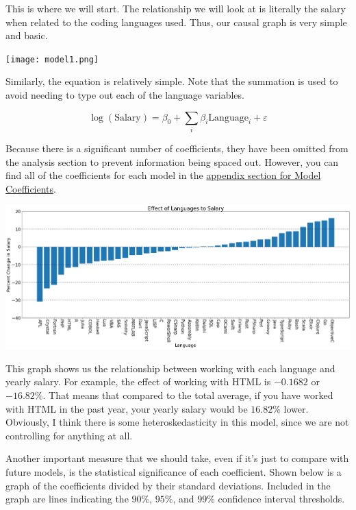 \documentclass{report}
\begin{document}
This is where we will start. The relationship we will look at is literally the salary when related to the coding languages used. Thus, our causal graph is very simple and basic.

\texttt{[image: model1.png]}

Similarly, the equation is relatively simple. Note that the summation is used to avoid needing to type out each of the language variables.

$$\log({\text{Salary}}) = \beta_0 + \sum_i{\beta_i \text{Language}_i} + \varepsilon$$

Because there is a significant number of coefficients, they have been omitted from the analysis section to prevent information being spaced out. However, you can find all of the coefficients for each model in the \hyperref[data:model1]{appendix section for Model Coefficients}.

\vspace{0.5in}

\includegraphics[width=0.9\linewidth]{model1coefficientlangauges.png}

\vspace{0.5in}

This graph shows us the relationship between working with each language and yearly salary. For example, the effect of working with HTML is $-0.1682$ or $-16.82\%$. That means that compared to the total average, if you have worked with HTML in the past year, your yearly salary would be $16.82\%$ lower. Obviously, I think there is some heteroskedasticity in this model, since we are not controlling for anything at all.

Another important measure that we should take, even if it's just to compare with future models, is the statistical significance of each coefficient. Shown below is a graph of the coefficients divided by their standard deviations. Included in the graph are lines indicating the $90\%$, $95\%$, and $99\%$ confidence interval thresholds.

\vspace{0.5in}
\end{document}
